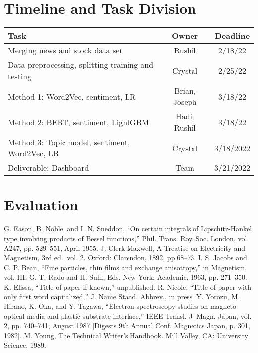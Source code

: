 \documentclass[conference]{IEEEtran}
\begin{document}
\section*{Timeline and Task Division}
\begin{table}[htbp]
\begin{center}
\begin{tabular}{|l||c|c|} \hline\hline
Task & Owner & Deadline \\ \hline 
Merging news and stock data set & Rushil & 2/18/22 \\
Data preprocessing, splitting training and testing & Crystal & 2/25/22 \\
Method 1: Word2Vec, sentiment, LR & Brian, Joseph & 3/18/22 \\
Method 2: BERT, sentiment, LightGBM & Hadi, Rushil & 3/18/22 \\
Method 3: Topic model, sentiment, Word2Vec, LR & Crystal & 3/18/2022 \\
Deliverable: Dashboard & Team & 3/21/2022 \\
\hline\hline
\end{tabular}
\end{center}
\end{table}

\section*{Evaluation}

\begin{thebibliography}{00}
 G. Eason, B. Noble, and I. N. Sneddon, ``On certain integrals of Lipschitz-Hankel type involving products of Bessel functions,'' Phil. Trans. Roy. Soc. London, vol. A247, pp. 529--551, April 1955.
 J. Clerk Maxwell, A Treatise on Electricity and Magnetism, 3rd ed., vol. 2. Oxford: Clarendon, 1892, pp.68--73.
 I. S. Jacobs and C. P. Bean, ``Fine particles, thin films and exchange anisotropy,'' in Magnetism, vol. III, G. T. Rado and H. Suhl, Eds. New York: Academic, 1963, pp. 271--350.
 K. Elissa, ``Title of paper if known,'' unpublished.
 R. Nicole, ``Title of paper with only first word capitalized,'' J. Name Stand. Abbrev., in press.
 Y. Yorozu, M. Hirano, K. Oka, and Y. Tagawa, ``Electron spectroscopy studies on magneto-optical media and plastic substrate interface,'' IEEE Transl. J. Magn. Japan, vol. 2, pp. 740--741, August 1987 [Digests 9th Annual Conf. Magnetics Japan, p. 301, 1982].
 M. Young, The Technical Writer's Handbook. Mill Valley, CA: University Science, 1989.
\end{thebibliography}
\end{document}
